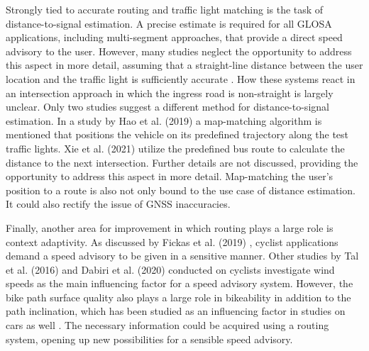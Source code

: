 Strongly tied to accurate routing and traffic light matching is the task of distance-to-signal estimation. A precise estimate is required for all GLOSA applications, including multi-segment approaches, that provide a direct speed advisory to the user. However, many studies neglect the opportunity to address this aspect in more detail, assuming that a straight-line distance between the user location and the traffic light is sufficiently accurate \cite{iglesias_i2v_2008, katsaros_performance_2011, koukoumidis_signalguru_2011, koukoumidis_leveraging_2012, krause_traffic_2012, li_open_2012, stevanovic_green_2013, stevanovic_comparative_2014, eckhoff_potentials_2013, gajananan_cooperative_2013, tal_vehicular-communications-based_2016, bernais_design_2016, stebbins_characterising_2017, sharara_impact_2019}. How these systems react in an intersection approach in which the ingress road is non-straight is largely unclear. Only two studies suggest a different method for distance-to-signal estimation. In a study by Hao et al. (2019) \cite{hao_eco-approach_2019} a map-matching algorithm is mentioned that positions the vehicle on its predefined trajectory along the test traffic lights. Xie et al. (2021) \cite{xie_dynamic_2021} utilize the predefined bus route to calculate the distance to the next intersection. Further details are not discussed, providing the opportunity to address this aspect in more detail. Map-matching the user's position to a route is also not only bound to the use case of distance estimation. It could also rectify the issue of GNSS inaccuracies.

Finally, another area for improvement in which routing plays a large role is context adaptivity. As discussed by Fickas et al. (2019) \cite{fickas_fast_2019}, cyclist applications demand a speed advisory to be given in a sensitive manner. Other studies by Tal et al. (2016) \cite{tal_vehicular-communications-based_2016} and Dabiri et al. (2020) \cite{dabiri_optimized_2020} conducted on cyclists investigate wind speeds as the main influencing factor for a speed advisory system. However, the bike path surface quality also plays a large role in bikeability \cite{wasserman_evaluating_2019} in addition to the path inclination, which has been studied as an influencing factor in studies on cars as well \cite{zhang_green_2020}. The necessary information could be acquired using a routing system, opening up new possibilities for a sensible speed advisory.

